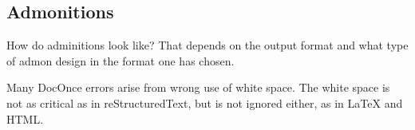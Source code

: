 \documentclass[%
twoside,                 %
final,                   %
10pt]{article}
\newenvironment{warning_mdfboxadmon}[1][]{
\begin{warning_mdfboxmdframed}[frametitle=#1]
}
{
\end{warning_mdfboxmdframed}
}
\newenvironment{question_mdfboxadmon}[1][]{
\begin{question_mdfboxmdframed}[frametitle=#1]
}
{
\end{question_mdfboxmdframed}
}
\begin{document}
\subsection{Admonitions}


\begin{question_mdfboxadmon}[Question.]
How do adminitions look like? That depends on the output format and
what type of admon design in the format one has chosen.
\end{question_mdfboxadmon}




\begin{warning_mdfboxadmon}
Many DocOnce errors arise from wrong use of white space. The white space
is not as critical as in reStructuredText, but is not ignored either,
as in {\LaTeX} and HTML.
\end{warning_mdfboxadmon}





\printindex
\end{document}
